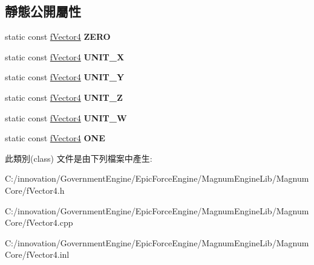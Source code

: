 \subsection*{靜態公開屬性}
\begin{DoxyCompactItemize}
\item 
static const \hyperlink{class_i_dream_sky_1_1f_vector4}{f\+Vector4} {\bfseries Z\+E\+RO}\hypertarget{class_i_dream_sky_1_1f_vector4_a97df13fd535d0a7825087fe08c6e979b}{}\label{class_i_dream_sky_1_1f_vector4_a97df13fd535d0a7825087fe08c6e979b}

\item 
static const \hyperlink{class_i_dream_sky_1_1f_vector4}{f\+Vector4} {\bfseries U\+N\+I\+T\+\_\+X}\hypertarget{class_i_dream_sky_1_1f_vector4_a4e41da9da30ba4e4a781a75a21f2539e}{}\label{class_i_dream_sky_1_1f_vector4_a4e41da9da30ba4e4a781a75a21f2539e}

\item 
static const \hyperlink{class_i_dream_sky_1_1f_vector4}{f\+Vector4} {\bfseries U\+N\+I\+T\+\_\+Y}\hypertarget{class_i_dream_sky_1_1f_vector4_a21434dbe8dd1b5aed783663ccc9a2113}{}\label{class_i_dream_sky_1_1f_vector4_a21434dbe8dd1b5aed783663ccc9a2113}

\item 
static const \hyperlink{class_i_dream_sky_1_1f_vector4}{f\+Vector4} {\bfseries U\+N\+I\+T\+\_\+Z}\hypertarget{class_i_dream_sky_1_1f_vector4_a3e608b298cb71cefdb250c3dd1c52f25}{}\label{class_i_dream_sky_1_1f_vector4_a3e608b298cb71cefdb250c3dd1c52f25}

\item 
static const \hyperlink{class_i_dream_sky_1_1f_vector4}{f\+Vector4} {\bfseries U\+N\+I\+T\+\_\+W}\hypertarget{class_i_dream_sky_1_1f_vector4_acb31703c5823659e5f1bf324382aec48}{}\label{class_i_dream_sky_1_1f_vector4_acb31703c5823659e5f1bf324382aec48}

\item 
static const \hyperlink{class_i_dream_sky_1_1f_vector4}{f\+Vector4} {\bfseries O\+NE}\hypertarget{class_i_dream_sky_1_1f_vector4_ac7f0585a4e3e40c63855e66b313bea8c}{}\label{class_i_dream_sky_1_1f_vector4_ac7f0585a4e3e40c63855e66b313bea8c}

\end{DoxyCompactItemize}


此類別(class) 文件是由下列檔案中產生\+:\begin{DoxyCompactItemize}
\item 
C\+:/innovation/\+Government\+Engine/\+Epic\+Force\+Engine/\+Magnum\+Engine\+Lib/\+Magnum\+Core/f\+Vector4.\+h\item 
C\+:/innovation/\+Government\+Engine/\+Epic\+Force\+Engine/\+Magnum\+Engine\+Lib/\+Magnum\+Core/f\+Vector4.\+cpp\item 
C\+:/innovation/\+Government\+Engine/\+Epic\+Force\+Engine/\+Magnum\+Engine\+Lib/\+Magnum\+Core/f\+Vector4.\+inl\end{DoxyCompactItemize}
